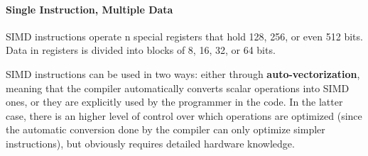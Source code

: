\paragraph{Single Instruction, Multiple Data}
SIMD instructions operate n special registers that hold 128, 256, or even 512 bits. Data in registers is divided into blocks of 8, 16, 32, or 64 bits.

SIMD instructions can be used in two ways: either through \textbf{auto-vectorization}, meaning that the compiler automatically converts scalar operations into SIMD ones, or they are explicitly used by the programmer in the code. In the latter case, there is an higher level of control over which operations are optimized (since the automatic conversion done by the compiler can only optimize simpler instructions), but obviously requires detailed hardware knowledge.